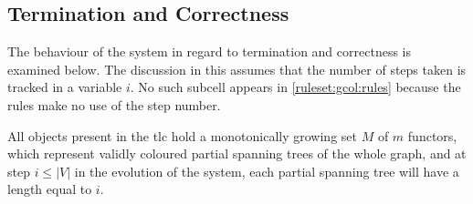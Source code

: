 \subsection{\label{sec:gcol:termination}Termination and Correctness}
The behaviour of the system in regard to termination and correctness is examined below.  The discussion in this  assumes that the number of steps taken is tracked in a variable \(i\).  No such subcell appears in \cref{ruleset:gcol:rules} because the rules make no use of the step number.

\begin{lemma}\label{lemma:gcol:grow}
All \bo{} objects present in the \gls{tlc} hold a monotonically growing set \(M\) of \(m\) \glspl{functor}, which represent validly coloured partial spanning trees of the whole graph, and at step \(i \leq |V|\) in the evolution of the system, each partial spanning tree will have a length equal to \(i\).
\end{lemma}

